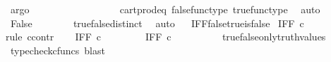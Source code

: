 \begin{isabellebody}
\ argo\isanewline
\ \ \ \ \isamarkupfalse%
\ \isamarkupfalse%
\ {\isachardoublequoteopen}{\isasymt}\ {\isacharequal}{\kern0pt}\ {\isasymf}{\isachardoublequoteclose}\isanewline
\ \ \ \ \ \ \isamarkupfalse%
\ cart{\isacharunderscore}{\kern0pt}prod{\isacharunderscore}{\kern0pt}eq{}\ false{\isacharunderscore}{\kern0pt}func{\isacharunderscore}{\kern0pt}type\ true{\isacharunderscore}{\kern0pt}func{\isacharunderscore}{\kern0pt}type\ \isamarkupfalse%
\ auto\isanewline
\ \ \ \ \isamarkupfalse%
\ \isamarkupfalse%
\ False\isanewline
\ \ \ \ \ \ \isamarkupfalse%
\ true{\isacharunderscore}{\kern0pt}false{\isacharunderscore}{\kern0pt}distinct\ \isamarkupfalse%
\ auto\isanewline
\ \isamarkupfalse%
\isanewline
{}\isamarkupfalse%
%
\endisatagproof
{\isafoldproof}%
%
\isadelimproof
\isanewline
%
\endisadelimproof
\isanewline
{}\isamarkupfalse%
\ IFF{\isacharunderscore}{\kern0pt}false{\isacharunderscore}{\kern0pt}true{\isacharunderscore}{\kern0pt}is{\isacharunderscore}{\kern0pt}false{\isacharcolon}{\kern0pt}\isanewline
\ {\isachardoublequoteopen}IFF\ {\isasymcirc}\isactrlsub c\ {\isasymlangle}{\isasymf}{\isacharcomma}{\kern0pt}{\isasymt}{\isasymrangle}\ {\isacharequal}{\kern0pt}\ {\isasymf}{\isachardoublequoteclose}\isanewline
%
\isadelimproof
%
\endisadelimproof
%
\isatagproof
{}\isamarkupfalse%
{\isacharparenleft}{\kern0pt}rule\ ccontr{\isacharparenright}{\kern0pt}\isanewline
\ \ \isamarkupfalse%
\ {\isachardoublequoteopen}IFF\ {\isasymcirc}\isactrlsub c\ {\isasymlangle}{\isasymf}{\isacharcomma}{\kern0pt}{\isasymt}{\isasymrangle}\ {\isasymnoteq}\ {\isasymf}{\isachardoublequoteclose}\isanewline
\ \ \isamarkupfalse%
\ \isamarkupfalse%
\ {\isachardoublequoteopen}IFF\ {\isasymcirc}\isactrlsub c\ {\isasymlangle}{\isasymf}{\isacharcomma}{\kern0pt}{\isasymt}{\isasymrangle}\ \ {\isacharequal}{\kern0pt}\ {\isasymt}{\isachardoublequoteclose}\isanewline
\ \ \ \ \isamarkupfalse%
\ true{\isacharunderscore}{\kern0pt}false{\isacharunderscore}{\kern0pt}only{\isacharunderscore}{\kern0pt}truth{\isacharunderscore}{\kern0pt}values\ \isamarkupfalse%
\ {\isacharparenleft}{\kern0pt}typecheck{\isacharunderscore}{\kern0pt}cfuncs{\isacharcomma}{\kern0pt}\ blast{\isacharparenright}{\kern0pt}\isanewline
\ \ \isamarkupfalse%
\ \isamarkupfalse%

\end{isabellebody}
